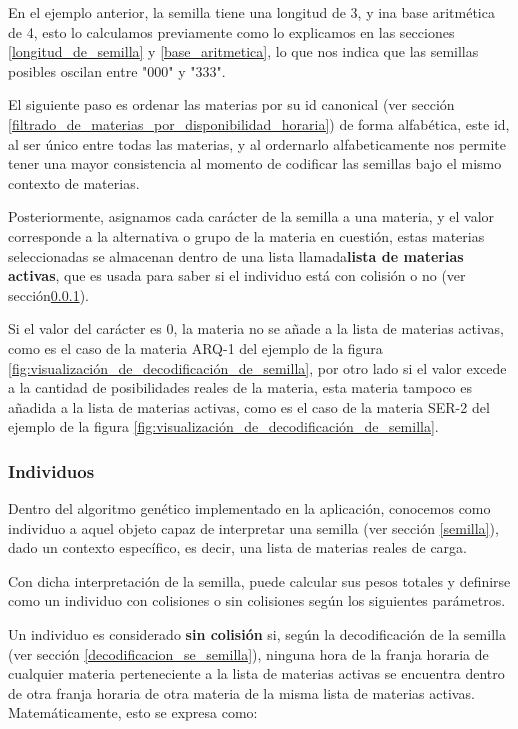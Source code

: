 En el ejemplo anterior, la semilla tiene una longitud de 3, y ina base aritmética de 4, esto lo calculamos previamente como lo explicamos en las secciones \ref{longitud_de_semilla} y \ref{base_aritmetica}, lo que nos indica que las semillas posibles oscilan entre "000" y "333".

El siguiente paso es ordenar las materias por su id canonical (ver sección \ref{filtrado_de_materias_por_disponibilidad_horaria}) de forma alfabética, este id, al ser único entre todas las materias, y al ordernarlo alfabeticamente nos permite tener una mayor consistencia al momento de codificar las semillas bajo el mismo contexto de materias.

Posteriormente, asignamos cada carácter de la semilla a una materia, y el valor corresponde a la alternativa o grupo de la materia en cuestión, estas materias seleccionadas se almacenan dentro de una lista llamada\textbf{lista de materias activas}, que es usada para saber si el individuo está con colisión o no (ver sección\ref{individuos}).

Si el valor del carácter es 0, la materia no se añade a la lista de materias activas, como es el caso de la materia ARQ-1 del ejemplo de la figura \ref{fig:visualización_de_decodificación_de_semilla}, por otro lado si el valor excede a la cantidad de posibilidades reales de la materia, esta materia tampoco es añadida a la lista de materias activas, como es el caso de la materia SER-2 del ejemplo de la figura \ref{fig:visualización_de_decodificación_de_semilla}.


\subsubsection{Individuos} \label{individuos}

Dentro del algoritmo genético implementado en la aplicación, conocemos como individuo a aquel objeto capaz de interpretar una semilla (ver sección \ref{semilla}), dado un contexto específico, es decir, una lista de materias reales de carga.

Con dicha interpretación de la semilla, puede calcular sus pesos totales y definirse como un individuo con colisiones o sin colisiones según los siguientes parámetros.

Un individuo es considerado \textbf{sin colisión} si, según la decodificación de la semilla (ver sección \ref{decodificacion_se_semilla}), ninguna hora de la franja horaria de cualquier materia perteneciente a la lista de materias activas se encuentra dentro de otra franja horaria de otra materia de la misma lista de materias activas. Matemáticamente, esto se expresa como:

